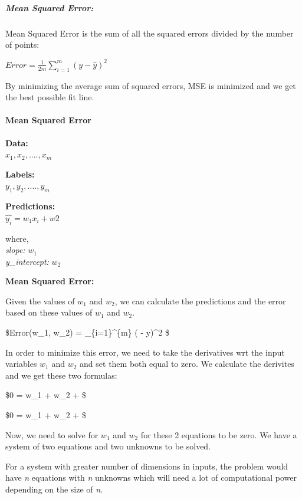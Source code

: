 \documentclass[11pt]{article}
\begin{document}
\hypertarget{mean-squared-error}{%
\subparagraph{Mean Squared Error:}\label{mean-squared-error}}

Mean Squared Error is the sum of all the squared errors divided by the
number of points:

\(Error = \frac{1}{2m} \sum_{i=1}^{m} (y - \hat{y})^2\)

By minimizing the average sum of squared errors, MSE is minimized and we
get the best possible fit line.

    \hypertarget{mean-squared-error}{%
\paragraph{Mean Squared Error}\label{mean-squared-error}}

\textbf{Data:}\\
\(x_1, x_2, ...., x_m\)

\textbf{Labels:}\\
\(y_1, y_2, ...., y_m\)

\textbf{Predictions:}\\
\(\hat{y_i} = w_1x_i + w2\)

where,\\
\emph{slope:} \(w_1\)\\
\emph{y\_intercept:} \(w_2\)

\textbf{Mean Squared Error:}

Given the values of \(w_1\) and \(w_2\), we can calculate the
predictions and the error based on these values of \(w_1\) and \(w_2\).

\$Error(w\_1, w\_2) =  \sum\_\{i=1\}\^{}\{m\} ( -
y)\^{}2 \$

In order to minimize this error, we need to take the derivatives wrt the
input variables \(w_1\) and \(w_2\) and set them both equal to zero. We
calculate the derivites and we get these two formulas:

\$0 = w\_1 + w\_2 +
 \$

\$0 = w\_1 + w\_2 +  \$

Now, we need to solve for \(w_1\) and \(w_2\) for these 2 equations to
be zero. We have a system of two equations and two unknowns to be
solved.

For a system with greater number of dimensions in inputs, the problem
would have \emph{n} equations with \emph{n} unknowns which will need a
lot of computational power depending on the size of \emph{n}.
\end{document}
